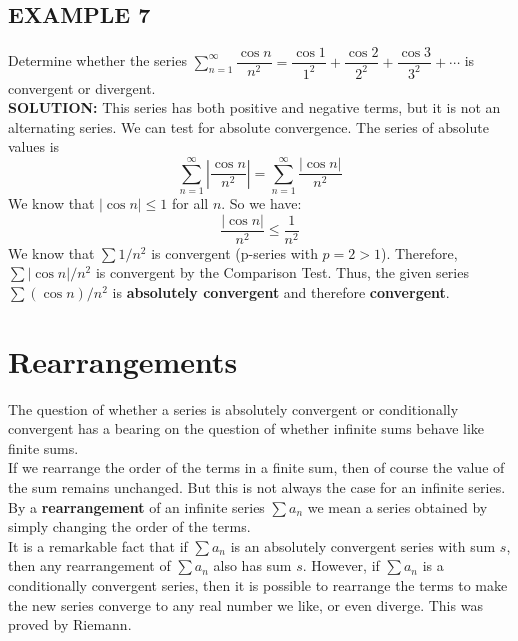 \documentclass{article}
\theoremstyle{mystyle}
\begin{document}
\subsection*{EXAMPLE 7}
Determine whether the series \( \sum_{n=1}^{\infty} \dfrac{\cos n}{n^2} = \dfrac{\cos 1}{1^2} + \dfrac{\cos 2}{2^2} + \dfrac{\cos 3}{3^2} + \cdots \) is convergent or divergent.\\
\textbf{SOLUTION:}
This series has both positive and negative terms, but it is not an alternating series. We can test for absolute convergence. The series of absolute values is
\[ \sum_{n=1}^{\infty} \left| \dfrac{\cos n}{n^2} \right| = \sum_{n=1}^{\infty} \dfrac{|\cos n|}{n^2} \]
We know that \(|\cos n| \le 1\) for all \(n\). So we have:
\[ \dfrac{|\cos n|}{n^2} \le \dfrac{1}{n^2} \]
We know that \( \sum 1/n^2 \) is convergent (p-series with \(p=2 > 1\)). Therefore, \( \sum |\cos n|/n^2 \) is convergent by the Comparison Test.
Thus, the given series \( \sum (\cos n)/n^2 \) is \textbf{absolutely convergent} and therefore \textbf{convergent}.

\section*{Rearrangements}
The question of whether a series is absolutely convergent or conditionally convergent has a bearing on the question of whether infinite sums behave like finite sums.\\
If we rearrange the order of the terms in a finite sum, then of course the value of the sum remains unchanged. But this is not always the case for an infinite series. By a \textbf{rearrangement} of an infinite series \( \sum a_n \) we mean a series obtained by simply changing the order of the terms.\\
It is a remarkable fact that if \( \sum a_n \) is an absolutely convergent series with sum \(s\), then any rearrangement of \( \sum a_n \) also has sum \(s\). However, if \( \sum a_n \) is a conditionally convergent series, then it is possible to rearrange the terms to make the new series converge to any real number we like, or even diverge. This was proved by Riemann.
\end{document}
